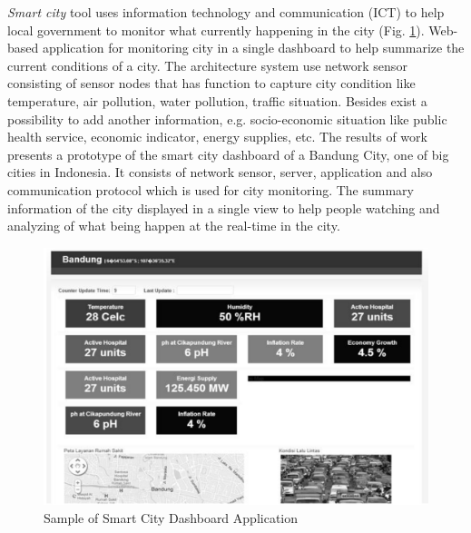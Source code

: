 	\emph{Smart city}\cite{6588063} tool uses information technology and communication (ICT) to help local government to monitor what currently happening in the city (Fig. \ref{img:smart_city}). Web-based application for monitoring city in a single dashboard to help summarize the current conditions of a city. The architecture system use network sensor consisting of sensor nodes that has function to capture city condition like temperature, air pollution, water pollution, traffic situation. Besides exist a possibility to add another information, e.g. socio-economic situation like public health service, economic indicator, energy supplies, etc. The results of work presents a prototype of the smart city dashboard of a Bandung City, one of big cities in Indonesia. It consists of network sensor, server, application and also communication protocol which is used for city monitoring. The summary information of the city  displayed in a single view to help people watching and analyzing of what being happen at the real-time in the city.
	  \begin{figure}[!ht]
		\centering
		\includegraphics[scale=0.4]{Material/examples/SmartCity.png}   
		\caption[Sample of Smart City Dashboard Application]{Sample of Smart City Dashboard Application} 
		\label{img:smart_city}                 
		\end{figure}

